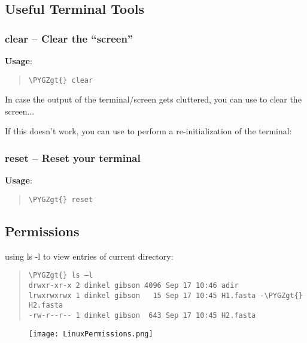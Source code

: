 \documentclass[a4paper,11pt,english]{sphinxmanual}
\def\PYGZgt{\char`\>}
\begin{document}
\subsection{Useful Terminal Tools}
\label{introduction:useful-terminal-tools}

\subsubsection{clear – Clear the “screen”}
\label{introduction:clear-clear-the-screen}
\textbf{Usage}:  
\begin{quote}

\begin{Verbatim}[frame=single, rulecolor=\color{lightgray}, fontfamily=courier, commandchars=\\\{\}]
\PYGZgt{} clear
\end{Verbatim}
\end{quote}

In case the output of the terminal/screen gets cluttered, you can use  to clear the screen...

If this doesn't work, you can use  to perform a re-initialization of the terminal:


\subsubsection{reset – Reset your terminal}
\label{introduction:reset-reset-your-terminal}
\textbf{Usage}:  
\begin{quote}

\begin{Verbatim}[frame=single, rulecolor=\color{lightgray}, fontfamily=courier, commandchars=\\\{\}]
\PYGZgt{} reset
\end{Verbatim}
\end{quote}


\subsection{Permissions}
\label{introduction:permissions}
using ls -l to view entries of current directory:
\begin{quote}

\begin{Verbatim}[frame=single, rulecolor=\color{lightgray}, fontfamily=courier, commandchars=\\\{\}]
\PYGZgt{} ls –l
drwxr-xr-x 2 dinkel gibson 4096 Sep 17 10:46 adir
lrwxrwxrwx 1 dinkel gibson   15 Sep 17 10:45 H1.fasta -\PYGZgt{} H2.fasta
-rw-r--r-- 1 dinkel gibson  643 Sep 17 10:45 H2.fasta
\end{Verbatim}
\end{quote}
\begin{figure}[htbp]
\centering

\texttt{[image: LinuxPermissions.png]}
\end{figure}
\end{document}
